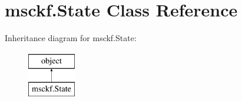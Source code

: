 \hypertarget{classmsckf_1_1_state}{\section{msckf.\-State Class Reference}
\label{classmsckf_1_1_state}
}
Inheritance diagram for msckf.\-State\-:\begin{figure}[H]
\begin{center}
\leavevmode
\includegraphics[height=2.000000cm]{classmsckf_1_1_state}
\end{center}
\end{figure}
